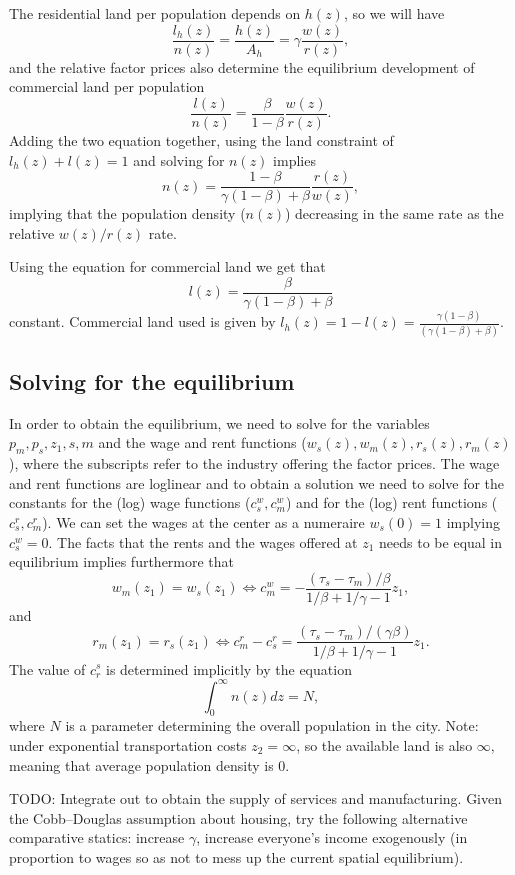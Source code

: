 \documentclass[10pt]{article}
\begin{document}
The residential land per population depends on $h(z)$, so we will have
\begin{equation*}
\frac{l_h(z)}{n(z)}=\frac{h(z)}{A_h}=\gamma\frac{w(z)}{r(z)},
\end{equation*}
and the relative factor prices also determine the equilibrium development of commercial land per population
\begin{equation*}
\frac{l(z)}{n(z)}=\frac{\beta}{1-\beta}\frac{w(z)}{r(z)}. 
\end{equation*}
Adding the two equation together, using the land constraint of $l_h(z)+l(z)=1$ and solving for $n(z)$ implies
\begin{equation}
n(z)=\frac{1-\beta}{\gamma(1-\beta)+\beta}\frac{r(z)}{w(z)},
\end{equation}
implying that the population density ($n(z)$) decreasing in the same rate as the relative $w(z)/r(z)$ rate. 

Using the equation for commercial land we get that 
\begin{equation}
l(z)=\frac{\beta}{\gamma(1-\beta)+\beta}
\end{equation}
constant. Commercial land used is given by $l_h(z)=1-l(z)=\frac{\gamma(1-\beta)}{(\gamma(1-\beta)+\beta)}$. 

\subsection{Solving for the equilibrium}
In order to obtain the equilibrium, we need to solve for the variables $p_m,p_s,z_1,s,m$ and the wage and rent functions ($w_s(z),w_m(z),r_s(z),r_m(z)$), where the subscripts refer to the industry offering the factor prices. The wage and rent functions are loglinear and to obtain a solution we need to solve for the constants for the (log) wage functions ($c^w_s,c^w_m$) and for the (log) rent functions ($c^r_s, c^r_m$). We can set the wages at the center as a numeraire $w_s(0)=1$ implying $c^w_s=0$. The facts that the rents and the wages offered at $z_1$ needs to be equal in equilibrium implies furthermore that
\begin{equation*}
w_m(z_1)=w_s(z_1) \Leftrightarrow c^w_m=-\frac{(\tau_s-\tau_m)/\beta}{1/\beta+1/\gamma-1}z_1,
\end{equation*}
and 
\begin{equation*}
r_m(z_1)=r_s(z_1) \Leftrightarrow c^r_m-c^r_s=\frac{(\tau_s-\tau_m)/(\gamma\beta)}{1/\beta+1/\gamma-1}{z_1}.
\end{equation*}
The value of $c_r^s$ is determined implicitly by the equation
\begin{equation*}
\int_0^\infty n(z)dz=N,
\end{equation*}
where $N$ is a parameter determining the overall population in the city. Note: under exponential transportation costs $z_2=\infty$, so the available land is also $\infty$, meaning that average population density is 0.



TODO: Integrate out to obtain the supply of services and manufacturing. Given the Cobb--Douglas assumption about housing, try the following alternative comparative statics: increase $\gamma$, increase everyone's income exogenously (in proportion to wages so as not to mess up the current spatial equilibrium).
\end{document}

